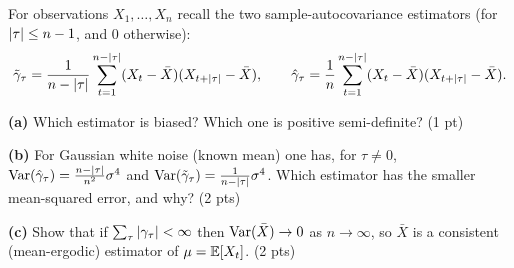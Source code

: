 \documentclass[11pt]{article}
\begin{document}
For observations $X_1,\dots,X_n$ recall the two sample-autocovariance estimators (for $\left\lvert \tau \right\rvert\le n-1$, and $0$ otherwise):
\[
\tilde{\gamma}_\tau=\frac{1}{n-\left\lvert \tau \right\rvert}\sum_{t=1}^{n-\left\lvert \tau \right\rvert}(X_t-\bar X)(X_{t+\left\lvert \tau \right\rvert}-\bar X),\qquad
\hat{\gamma}_\tau=\frac{1}{n}\sum_{t=1}^{n-\left\lvert \tau \right\rvert}(X_t-\bar X)(X_{t+\left\lvert \tau \right\rvert}-\bar X).
\]

\textbf{(a)} Which estimator is biased? Which one is positive semi-definite? \hfill(1 pt)

\textbf{(b)} For Gaussian white noise (known mean) one has, for $\tau\ne0$, $\operatorname{Var}(\hat{\gamma}_\tau)=\tfrac{n-\left\lvert \tau \right\rvert}{n^2}\sigma^4$ and $\operatorname{Var}(\tilde{\gamma}_\tau)=\tfrac{1}{n-\left\lvert \tau \right\rvert}\sigma^4$. Which estimator has the smaller mean-squared error, and why? \hfill(2 pts)

\textbf{(c)} Show that if $\sum_{\tau}\left\lvert \gamma_\tau \right\rvert<\infty$ then $\operatorname{Var}(\bar X)\to0$ as $n\to\infty$, so $\bar X$ is a consistent (mean-ergodic) estimator of $\mu=\mathbb{E}[X_t]$. \hfill(2 pts)
\answerpage
\end{document}
